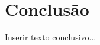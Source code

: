 \documentclass[a4paper,12pt,oneside,onecolumn]{article}
\begin{document}
\section{Conclusão}

Inserir texto conclusivo...





\end{document}

